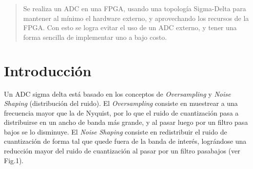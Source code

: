 \documentclass[a4paper,conference]{IEEEtran}
\begin{document}




\maketitle


\begin{abstract}
Se realiza un ADC en una FPGA, usando una topología Sigma-Delta para mantener al mínimo el hardware externo, y aprovechando los recursos de la FPGA. Con esto se logra evitar el uso de un ADC externo, y tener una forma sencilla de implementar uno a bajo costo.
\end{abstract}





%
\IEEEpeerreviewmaketitle



\section{Introducci\'on}
Un ADC sigma delta est\'a basado en los conceptos de \textit{Oversampling} y \textit{Noise Shaping} (distribuci\'on del ruido). El \textit{Oversampling} consiste en muestrear a una frecuencia mayor que la de Nyquist, por lo que el ruido de cuantizaci\'on pasa a distribuirse en un ancho de banda m\'as grande, y al pasar luego por un filtro pasa bajos se lo disminuye. El \textit{Noise Shaping} consiste en redistribuir el ruido de cuantizaci\'on de forma tal que quede fuera de la banda de inter\'es, logr\'andose una reducción mayor del ruido de cuantizaci\'on al pasar por un filtro pasabajos (ver Fig.1).
\end{document}
